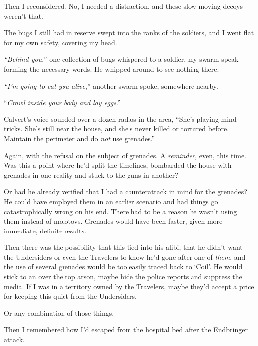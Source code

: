 Then I reconsidered.  No, I needed a distraction, and these slow-moving decoys weren't that.



The bugs I still had in reserve swept into the ranks of the soldiers, and I went flat for my own safety, covering my head.



\emph{``Behind you},'' one collection of bugs whispered to a soldier, my swarm-speak forming the necessary words.  He whipped around to see nothing there.



\emph{``I'm going to eat you alive},'' another swarm spoke, somewhere nearby.



``\emph{Crawl inside your body and lay eggs}.''



Calvert's voice sounded over a dozen radios in the area, ``She's playing mind tricks.  She's still near the house, and she's never killed or tortured before.  Maintain the perimeter and do \emph{not} use grenades.''



Again, with the refusal on the subject of grenades.  A \emph{reminder,} even, this time.  Was this a point where he'd split the timelines, bombarded the house with grenades in one reality and stuck to the guns in another?



Or had he already verified that I had a counterattack in mind for the grenades?  He could have employed them in an earlier scenario and had things go catastrophically wrong on his end.  There had to be a reason he wasn't using them instead of molotovs.  Grenades would have been faster, given more immediate, definite results.



Then there was the possibility that this tied into his alibi, that he didn't want the Undersiders or even the Travelers to know he'd gone after one of \emph{them}, and the use of several grenades would be too easily traced back to `Coil'.  He would stick to an over the top arson, maybe hide the police reports and suppress the media.  If I was in a territory owned by the Travelers, maybe they'd accept a price for keeping this quiet from the Undersiders.



Or any combination of those things.



Then I remembered how I'd escaped from the hospital bed after the Endbringer attack.



